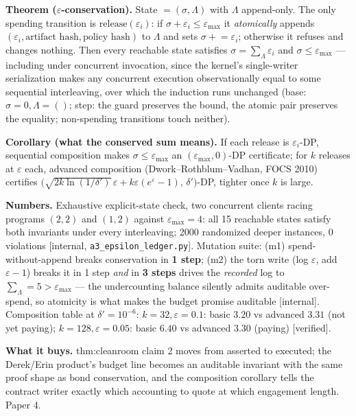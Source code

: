 \documentclass[11pt,a4paper]{article}
\begin{document}
\begin{thebox}
\textbf{Theorem ($\varepsilon$-conservation).} State $=(\sigma,\Lambda)$ with $\Lambda$ append-only. The only spending transition is $\mathrm{release}(\varepsilon_i)$: if $\sigma+\varepsilon_i\le\varepsilon_{\max}$ it \emph{atomically} appends $(\varepsilon_i,\text{artifact hash},\text{policy hash})$ to $\Lambda$ and sets $\sigma\mathrel{+}=\varepsilon_i$; otherwise it refuses and changes nothing. Then every reachable state satisfies $\sigma=\sum_{\Lambda}\varepsilon_i$ and $\sigma\le\varepsilon_{\max}$ --- including under concurrent invocation, since the kernel's single-writer serialization makes any concurrent execution observationally equal to some sequential interleaving, over which the induction runs unchanged (base: $\sigma=0,\Lambda=()$; step: the guard preserves the bound, the atomic pair preserves the equality; non-spending transitions touch neither).

\textbf{Corollary (what the conserved sum means).} If each release is $\varepsilon_i$-DP, sequential composition makes $\sigma\le\varepsilon_{\max}$ an $(\varepsilon_{\max},0)$-DP certificate; for $k$ releases at $\varepsilon$ each, advanced composition (Dwork--Rothblum--Vadhan, FOCS 2010) certifies $\bigl(\sqrt{2k\ln(1/\delta')}\,\varepsilon+k\varepsilon(e^\varepsilon-1),\,\delta'\bigr)$-DP, tighter once $k$ is large.
\end{thebox}

\textbf{Numbers.} Exhaustive explicit-state check, two concurrent clients racing programs $(2,2)$ and $(1,2)$ against $\varepsilon_{\max}=4$: all 15 reachable states satisfy both invariants under every interleaving; 2000 randomized deeper instances, 0 violations [internal, \texttt{a3\_epsilon\_ledger.py}]. Mutation suite: (m1) spend-without-append breaks conservation in \textbf{1 step}; (m2) the torn write (log $\varepsilon$, add $\varepsilon-1$) breaks it in 1 step \emph{and} in \textbf{3 steps} drives the \emph{recorded} log to $\sum_\Lambda=5>\varepsilon_{\max}$ --- the undercounting balance silently admits auditable over-spend, so atomicity is what makes the budget promise auditable [internal]. Composition table at $\delta'=10^{-6}$: $k{=}32,\varepsilon{=}0.1$: basic $3.20$ vs advanced $3.31$ (not yet paying); $k{=}128,\varepsilon{=}0.05$: basic $6.40$ vs advanced $3.30$ (paying) [verified].

\textbf{What it buys.} thm:cleanroom claim 2 moves from asserted to executed; the Derek/Erin product's budget line becomes an auditable invariant with the same proof shape as bond conservation, and the composition corollary tells the contract writer exactly which accounting to quote at which engagement length. Paper 4.
\end{document}
